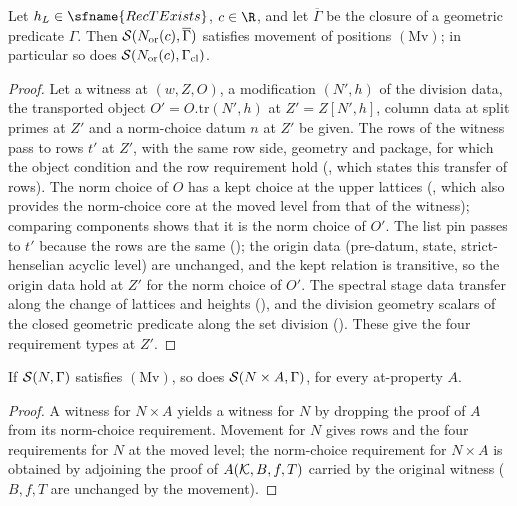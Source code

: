 \begin{lemma}\label{pf:bundles:lem:mvor}
Let $h_L\in\sfname{RecTExists}$, $c\in\R$, and let $\overline\Gamma$ be the closure of a geometric predicate $\Gamma$. Then
$\mathcal S(N_{\mathrm{or}}(c),\overline\Gamma)$ satisfies movement of positions $(\mathrm{Mv})$; in particular so does
$\mathcal S(N_{\mathrm{or}}(c),\Gamma_{\mathrm{cl}})$.
\end{lemma}

\begin{proof}
Let a witness at $(w,Z,O)$, a modification $(N',h)$ of the division data, the transported object $O'=O.\mathrm{tr}(N',h)$ at
$Z'=Z[N',h]$, column data at split primes at $Z'$ and a norm-choice datum $n$ at $Z'$ be given. The rows of the witness pass to rows
$t'$ at $Z'$, with the same row side, geometry and package, for which the object condition and the row requirement hold
(, which states this transfer of rows). The norm choice of $O$
has a kept choice at the upper lattices (, which also provides the
norm-choice core at the moved level from that of the witness); comparing components shows that it is the norm choice of $O'$. The list
pin passes to $t'$ because the rows are the same (); the origin data (pre-datum,
state, strict-henselian acyclic level) are unchanged, and the kept relation is transitive, so the origin data hold at $Z'$ for the norm
choice of $O'$. The spectral stage data transfer along the change of lattices and heights
(), and the division geometry scalars of the closed geometric
predicate along the set division (). These give the four
requirement types at $Z'$.
\end{proof}

\begin{lemma}\label{pf:bundles:lem:mvA}
If $\mathcal S(N,\Gamma)$ satisfies $(\mathrm{Mv})$, so does $\mathcal S(N\times A,\Gamma)$, for every at-property $A$.
\end{lemma}

\begin{proof}
A witness for $N\times A$ yields a witness for $N$ by dropping the proof of $A$ from its norm-choice requirement. Movement for $N$ gives
rows and the four requirements for $N$ at the moved level; the norm-choice requirement for $N\times A$ is obtained by adjoining the proof
of $A(\mathcal K,B,f,T)$ carried by the original witness ($B,f,T$ are unchanged by the movement).
\end{proof}

